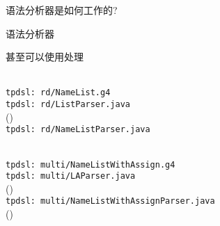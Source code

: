 
\begin{frame}{}
  \begin{center}
    \Large{ 语法分析器是如何工作的?}
  \end{center}
\end{frame}

\begin{frame}{}
  \begin{center}
    语法分析器

    \vspace{0.50cm}
    \vspace{1.00cm}

    甚至可以使用处理
  \end{center}
\end{frame}

\begin{frame}{}
  \begin{center}
	 \\[20pt]
	\texttt{tpdsl: rd/NameList.g4}  \\[40pt]
	\pause
	\texttt{tpdsl: rd/ListParser.java}
	\\ (\texttt{}) \\[30pt]
	\pause
	\texttt{tpdsl: rd/NameListParser.java}
  \end{center}
\end{frame}

\begin{frame}{}
  \begin{center}
	 \\[20pt]
	\texttt{tpdsl: multi/NameListWithAssign.g4}  \\[40pt]
	\pause
	\texttt{tpdsl: multi/LAParser.java}
	\\(\texttt{}) \\[30pt]
	\pause
	\texttt{tpdsl: multi/NameListWithAssignParser.java}
	\\(\texttt{})
  \end{center}
\end{frame}

